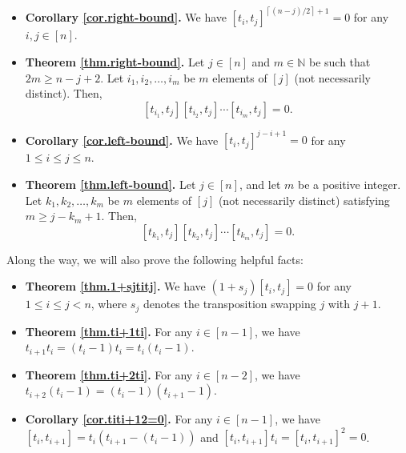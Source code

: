 \documentclass[numbers=enddot,12pt,final,onecolumn,notitlepage]{scrartcl}%
\theoremstyle{definition}
\begin{document}
\begin{itemize}
\item \textbf{Corollary \ref{cor.right-bound}.} We have $\left[  t_{i}%
,t_{j}\right]  ^{\left\lceil \left(  n-j\right)  /2\right\rceil +1}=0$ for any
$i,j\in\left[  n\right]  $.

\item \textbf{Theorem \ref{thm.right-bound}.} Let $j\in\left[  n\right]  $ and
$m\in\mathbb{N}$ be such that $2m\geq n-j+2$. Let $i_{1},i_{2},\ldots,i_{m}$
be $m$ elements of $\left[  j\right]  $ (not necessarily distinct). Then,
\[
\left[  t_{i_{1}},t_{j}\right]  \left[  t_{i_{2}},t_{j}\right]  \cdots\left[
t_{i_{m}},t_{j}\right]  =0.
\]


\item \textbf{Corollary \ref{cor.left-bound}.} We have $\left[  t_{i}%
,t_{j}\right]  ^{j-i+1}=0$ for any $1\leq i\leq j\leq n$.

\item \textbf{Theorem \ref{thm.left-bound}.} Let $j\in\left[  n\right]  $, and
let $m$ be a positive integer. Let $k_{1},k_{2},\ldots,k_{m}$ be $m$ elements
of $\left[  j\right]  $ (not necessarily distinct) satisfying $m\geq
j-k_{m}+1$. Then,
\[
\left[  t_{k_{1}},t_{j}\right]  \left[  t_{k_{2}},t_{j}\right]  \cdots\left[
t_{k_{m}},t_{j}\right]  =0.
\]

\end{itemize}

Along the way, we will also prove the following helpful facts:

\begin{itemize}
\item \textbf{Theorem \ref{thm.1+sjtitj}.} We have $\left(  1+s_{j}\right)
\left[  t_{i},t_{j}\right]  =0$ for any $1\leq i\leq j<n$, where $s_{j}$
denotes the transposition swapping $j$ with $j+1$.

\item \textbf{Theorem \ref{thm.ti+1ti}.} For any $i\in\left[  n-1\right]  $,
we have $t_{i+1}t_{i}=\left(  t_{i}-1\right)  t_{i}=t_{i}\left(
t_{i}-1\right)  $.

\item \textbf{Theorem \ref{thm.ti+2ti}.} For any $i\in\left[  n-2\right]  $,
we have $t_{i+2}\left(  t_{i}-1\right)  =\left(  t_{i}-1\right)  \left(
t_{i+1}-1\right)  $.

\item \textbf{Corollary \ref{cor.titi+12=0}.} For any $i\in\left[  n-1\right]
$, we have $\left[  t_{i},t_{i+1}\right]  =t_{i}\left(  t_{i+1}-\left(
t_{i}-1\right)  \right)  $ and $\left[  t_{i},t_{i+1}\right]  t_{i}=\left[
t_{i},t_{i+1}\right]  ^{2}=0$.
\end{itemize}
\end{document}
